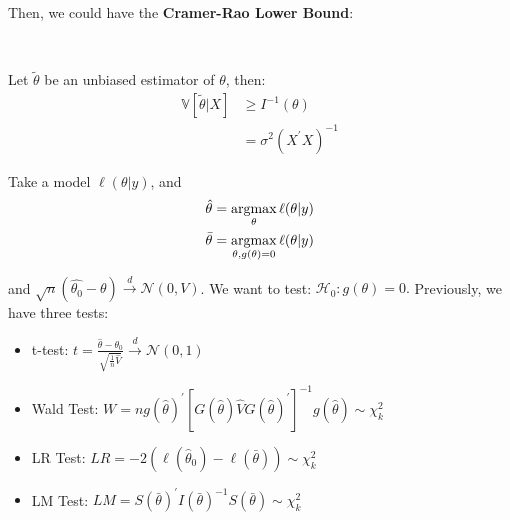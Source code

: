 Then, we could have the \textbf{Cramer-Rao Lower Bound}:
\begin{definition}
    \ 

    Let $\tilde{\theta }$ be an unbiased estimator of $\theta $, then:
    \begin{align*}
        \mathbb{V}[\tilde{\theta }|X] &\geq I^{-1}(\theta )\\
        &= \sigma^2 (X^{\prime}X)^{-1}
    \end{align*}
\end{definition}

Take a model $\ell(\theta |y)$, and
\begin{align*}
    \hat{\theta} &= \operatorname*{arg max}_{\theta}\ell(\theta|y) \\
    \bar{\theta} &= \operatorname*{arg max}_{\theta, g(\theta)=0} \ell(\theta|y)
\end{align*}

and $\sqrt{n}(\hat{\theta_0} - \theta) \overset{d}{\rightarrow} \mathcal{N}(0, V)$. 
We want to test: $\mathcal{H}_0: g(\theta)=0.$
Previously, we have three tests:
\begin{itemize}
    \item t-test: $t = \frac{\hat{\theta} - \theta_0}{\sqrt{\frac{1}{n}\hat{V}}} \overset{d}{\rightarrow} \mathcal{N}(0, 1)$
    \item Wald Test: $W = n g(\hat{\theta})^{\prime} [G(\hat{\theta})\hat{V}G(\hat{\theta})^{\prime}]^{-1}g(\hat{\theta}) \sim \chi_k^2$
    \item LR Test: $LR = -2(\ell(\hat{\theta}_0) - \ell(\bar{\theta})) \sim \chi_k^2$
    \item LM Test: $LM = S(\bar{\theta})^{\prime}  I(\bar{\theta})^{-1} S(\bar{\theta}) \sim \chi_k^2$
\end{itemize}

